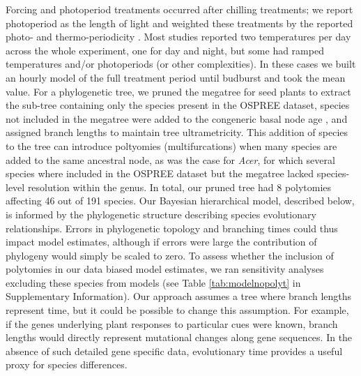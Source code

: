 \documentclass[11pt]{article}
\begin{document}
Forcing and photoperiod treatments occurred after chilling treatments; we report photoperiod as the length of light and weighted these treatments by the reported photo- and thermo-periodicity \citep{buonaiuto2023experimental}. Most studies reported two temperatures per day across the whole experiment, one for day and night, but some had ramped temperatures and/or photoperiods (or other complexities). In these cases we built an hourly model of the full treatment period until budburst and took the mean value. %
For a phylogenetic tree, we pruned the megatree for seed plants \citep{smith2018constructing} to extract the sub-tree containing only the species present in the OSPREE dataset, species not included in the megatree were added to the congeneric basal node age \citep[using the function `congeneric.merge' in][]{pearse2015pez}, and assigned branch lengths to maintain tree ultrametricity. This addition of species to the tree can introduce poltyomies (multifurcations) when many species are added to the same ancestral node, as was the case for \emph{Acer}, for which several species where included in the OSPREE dataset but the megatree lacked species-level resolution within the genus. In total, our pruned tree had 8 polytomies affecting 46 out of 191 species. Our Bayesian hierarchical model, described below, is informed by the phylogenetic structure describing species evolutionary relationships. Errors in phylogenetic topology and branching times could thus impact model estimates, although if errors were large the contribution of phylogeny would simply be scaled to zero. To assess whether the inclusion of polytomies in our data biased model estimates, we ran sensitivity analyses excluding these species from models (see Table \ref{tab:modelnopolyt} in Supplementary Information). Our approach assumes a tree where branch lengths represent time, but it could be possible to change this assumption. For example, if the genes underlying plant responses to particular cues were known, branch lengths would directly represent mutational changes along gene sequences. In the absence of such detailed gene specific data, evolutionary time provides a useful proxy for species differences.\\ 
\end{document}
